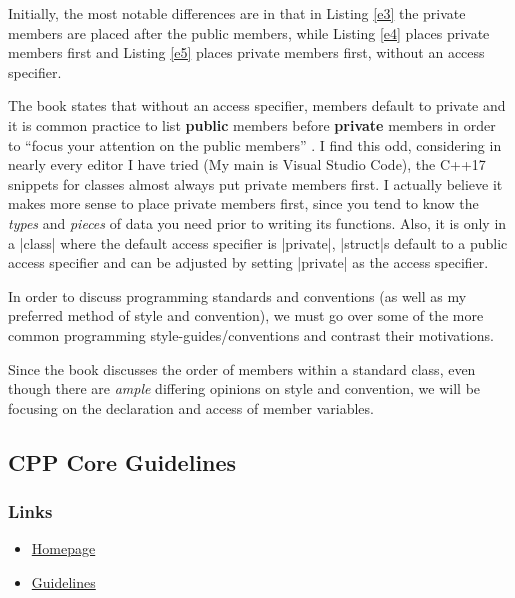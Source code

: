 \documentclass[12pt]{report}
\theoremstyle{definition}
\theoremstyle{plain}
\theoremstyle{plain}
\begin{document}
        Initially, the most notable differences are in that in Listing
          \ref{e3} the private members are placed after the public members,
          while Listing \ref{e4} places private members first and Listing
          \ref{e5} places private members first, without an access specifier.

        The book states that without an access specifier, members default to
          private and it is common practice to list \textbf{public} members
          before \textbf{private} members in order to ``focus your attention
          on the public members'' \autocite{malik2015}. I find this odd,
          considering in nearly every editor I have tried (My main is
          Visual Studio Code), the C++17 snippets for classes almost always
          put private members first. I actually believe it makes more sense
          to place private members first, since you tend to know the
          \textit{types} and \textit{pieces} of data you need prior to
          writing its functions. Also, it is only in a |class| where the default
          access specifier is |private|, |struct|s default to a public access specifier
          and can be adjusted by setting |private| as the access specifier.

        In order to discuss programming standards and conventions (as well as
          my preferred method of style and convention), we must go over some of
          the more common programming style-guides/conventions and contrast
          their motivations.

        Since the book discusses the order of members within a standard class, even
          though there are \textit{ample} differing opinions on style and convention, we will
          be focusing on the declaration and access of member variables.

        \subsection{CPP Core Guidelines} 
          \subsubsection{Links}
            \begin{itemize}
              \item \href{https://github.com/isocpp/CppCoreGuidelines}{Homepage}
              \item \href{https://github.com/isocpp/CppCoreGuidelines/blob/master/CppCoreGuidelines.md}{Guidelines}
            \end{itemize}
\end{document}
